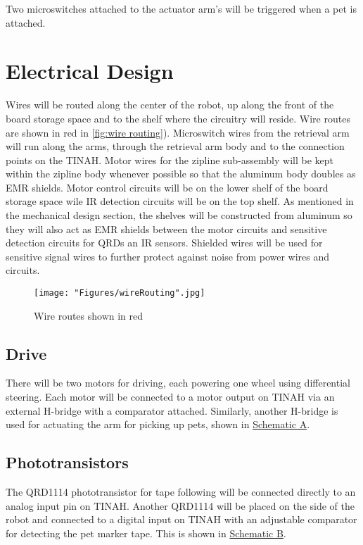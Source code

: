 \documentclass[11pt, oneside]{article} %
\begin{document}
	Two microswitches attached to the actuator arm's will be triggered when a pet is attached.
	

\section{Electrical Design}

Wires will be routed along the center of the robot, up along the front of the board storage space and to the shelf where the circuitry will reside. Wire routes are shown in red in \autoref{fig:wire routing}). Microswitch wires from the retrieval arm will run along the arms, through the retrieval arm body and to the connection points on the TINAH. Motor wires for the zipline sub-assembly will be kept within the zipline body whenever possible so that the aluminum body doubles as EMR shields. Motor control circuits will be on the lower shelf of the board storage space wile IR detection circuits will be on the top shelf. As mentioned in the mechanical design section, the shelves will be constructed from aluminum so they will also act as EMR shields between the motor circuits and sensitive detection circuits for QRDs an IR sensors. Shielded wires will be used for sensitive signal wires to further protect against noise from power wires and circuits.

\begin{figure}[h]
	\centering
	\texttt{[image: "Figures/wireRouting".jpg]}
	\caption[Wire Routing]{Wire routes shown in red}
	\label{fig:wire routing}
\end{figure}

	\newpage
	\subsection{Drive}
	
	There will be two motors for driving, each powering one wheel using differential steering. Each motor will be connected to a motor output on TINAH via an external H-bridge with a comparator attached. Similarly, another H-bridge is used for actuating the arm for picking up pets, shown in \hyperref[sch:A]{Schematic A}.
	
	\subsection{Phototransistors}
	
	The QRD1114 phototransistor for tape following will be connected directly to an analog input pin on TINAH. Another QRD1114 will be placed on the side of the robot and connected to a digital input on TINAH with an adjustable comparator for detecting the pet marker tape. This is shown in \hyperref[sch:B]{Schematic B}.
	
\end{document}
